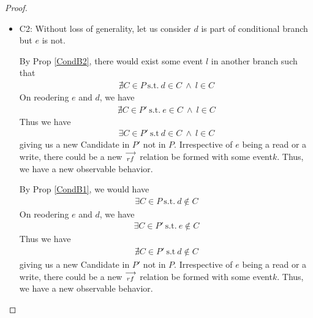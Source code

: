 \begin{proof}
\begin{itemize}

                \item C2: Without loss of generality, let us consider $d$ is part of conditional branch but $e$ is not. 
                
                    By Prop \ref{CondB2}, there would exist some event $l$ in another branch such that 
                    \begin{align*}
                        \nexists C \in P \ \text{s.t.} \ d \in C \ \wedge \ l \in C 
                    \end{align*}
                    On reodering $e$ and $d$, we have 
                    \begin{align*}
                        \nexists C \in P' \ \text{s.t.} \ e \in C \ \wedge \ l \in C 
                    \end{align*}
                    Thus we have 
                    \begin{align*}
                        \exists C \in P' \ \text{s.t} \ d \in C \ \wedge \ l \in C
                    \end{align*}
                    giving us a new Candidate in $P'$ not in $P$. 
                    Irrespective of $e$ being a read or a write, there could be a new $\stackrel{\longrightarrow}{_{rf}}$ relation be formed with some event$k$. Thus, we have a new observable behavior. 

                    By Prop \ref{CondB1}, we would have 
                    \begin{align*}
                        \exists C \in P \ \text{s.t.} \ d \notin C  
                    \end{align*}
                    On reodering $e$ and $d$, we have 
                    \begin{align*}
                        \exists C \in P' \ \text{s.t.} \ e \notin C  
                    \end{align*}
                    Thus we have 
                    \begin{align*}
                        \nexists C \in P' \ \text{s.t} \ d \notin C 
                    \end{align*}
                    giving us a new Candidate in $P'$ not in $P$.
                    Irrespective of $e$ being a read or a write, there could be a new $\stackrel{\longrightarrow}{_{rf}}$ relation be formed with some event$k$. Thus, we have a new observable behavior. 


\end{itemize}
\end{proof}
